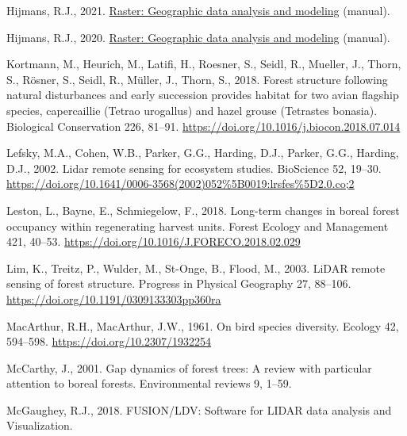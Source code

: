 \documentclass[
]{article}
\newlength{\cslhangindent}
\newlength{\cslentryspacingunit} %
\newenvironment{CSLReferences}[2] %
 {%
  \setlength{\parindent}{0pt}
  \ifodd #1
  \let\oldpar\par
  \def\par{\hangindent=\cslhangindent\oldpar}
  \fi
  \setlength{\parskip}{#2\cslentryspacingunit}
 }%
 {}
\begin{document}
\begin{CSLReferences}{1}{0}
\leavevmode{}%
Hijmans, R.J., 2021. \href{https://CRAN.R-project.org/package=raster}{Raster: {Geographic} data analysis and modeling} (manual).

\leavevmode{}%
Hijmans, R.J., 2020. \href{https://CRAN.R-project.org/package=raster}{Raster: {Geographic} data analysis and modeling} (manual).

\leavevmode{}%
Kortmann, M., Heurich, M., Latifi, H., Roesner, S., Seidl, R., Mueller, J., Thorn, S., Rösner, S., Seidl, R., Müller, J., Thorn, S., 2018. Forest structure following natural disturbances and early succession provides habitat for two avian flagship species, capercaillie ({Tetrao} urogallus) and hazel grouse ({Tetrastes} bonasia). Biological Conservation 226, 81--91. \url{https://doi.org/10.1016/j.biocon.2018.07.014}

\leavevmode{}%
Lefsky, M.A., Cohen, W.B., Parker, G.G., Harding, D.J., Parker, G.G., Harding, D.J., 2002. Lidar remote sensing for ecosystem studies. BioScience 52, 19--30. \url{https://doi.org/10.1641/0006-3568(2002)052\%5B0019:lrsfes\%5D2.0.co;2}

\leavevmode{}%
Leston, L., Bayne, E., Schmiegelow, F., 2018. Long-term changes in boreal forest occupancy within regenerating harvest units. Forest Ecology and Management 421, 40--53. \url{https://doi.org/10.1016/J.FORECO.2018.02.029}

\leavevmode{}%
Lim, K., Treitz, P., Wulder, M., St-Onge, B., Flood, M., 2003. {LiDAR} remote sensing of forest structure. Progress in Physical Geography 27, 88--106. \url{https://doi.org/10.1191/0309133303pp360ra}

\leavevmode{}%
MacArthur, R.H., MacArthur, J.W., 1961. On bird species diversity. Ecology 42, 594--598. \url{https://doi.org/10.2307/1932254}

\leavevmode{}%
McCarthy, J., 2001. Gap dynamics of forest trees: A review with particular attention to boreal forests. Environmental reviews 9, 1--59.

\leavevmode{}%
McGaughey, R.J., 2018. {FUSION}/{LDV}: {Software} for {LIDAR} data analysis and {Visualization}.


\end{CSLReferences}
\end{document}
